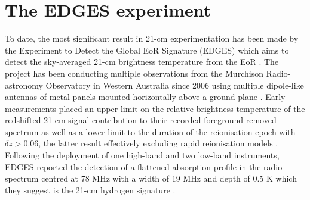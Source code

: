 \section{The EDGES experiment}\label{sec:edges}
To date, the most significant result in 21-cm experimentation has been made by the Experiment to Detect the Global EoR Signature (EDGES) which aims to detect the sky-averaged 21-cm brightness temperature from the EoR \citep{edgesCal}. The project has been conducting multiple observations from the Murchison Radio-astronomy Observatory in Western Australia since 2006 \citep{edgesCal} using multiple dipole-like antennas of metal panels mounted horizontally above a ground plane \citep{edgesNature}. Early measurements placed an upper limit on the relative brightness temperature of the redshifted 21-cm signal contribution to their recorded foreground-removed spectrum \citep{edges2008} as well as a lower limit to the duration of the reionisation epoch with $\delta z > 0.06$, the latter result effectively excluding rapid reionisation models \citep{edges_limits}. Following the deployment of one high-band and two low-band instruments, EDGES reported the detection of a flattened absorption profile in the radio spectrum centred at 78 MHz with a width of 19 MHz and depth of 0.5 K which they suggest is the 21-cm hydrogen signature \citep{edgesNature}.

